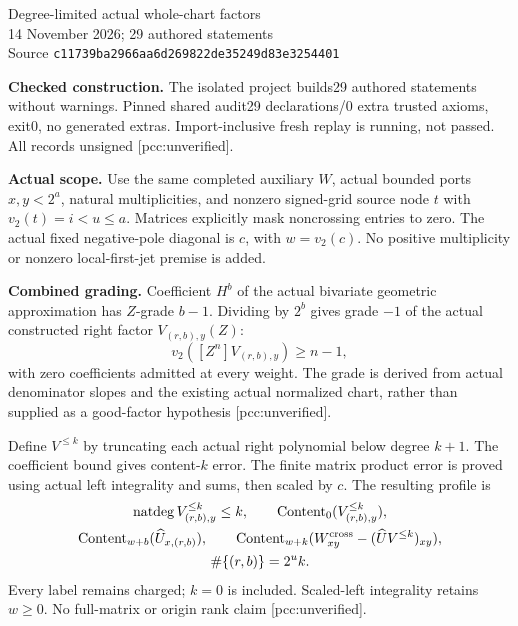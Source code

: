 \documentclass[10pt]{article}
\begin{document}
\begin{center}{\Large Degree-limited actual whole-chart factors}\\[4pt]
14 November 2026; 29 authored statements\\
Source \texttt{c11739ba2966aa6d269822de35249d83e3254401}
\end{center}
\textbf{Checked construction.} The isolated project builds29 authored statements
without warnings. Pinned shared audit29 declarations/0 extra trusted axioms,
exit0, no generated extras. Import-inclusive fresh replay is running,
not passed. All records unsigned [pcc:unverified].

\textbf{Actual scope.} Use the same completed auxiliary $W$, actual bounded
ports $x,y<2^a$, natural multiplicities, and nonzero signed-grid source node
$t$ with $v_2(t)=i<u\le a$. Matrices explicitly mask noncrossing entries to
zero. The actual fixed negative-pole diagonal is $c$, with $w=v_2(c)$.
No positive multiplicity or nonzero local-first-jet premise is added.

\textbf{Combined grading.} Coefficient $H^b$ of the actual bivariate
geometric approximation has $Z$-grade $b-1$. Dividing by $2^b$ gives
grade $-1$ of the actual constructed right factor $V_{(r,b),y}(Z)$:
\[
 v_2([Z^n]V_{(r,b),y})\ge n-1,
\]
with zero coefficients admitted at every weight. The grade is derived from
actual denominator slopes and the existing actual normalized chart, rather
than supplied as a good-factor hypothesis [pcc:unverified].

Define $V^{\le k}$ by truncating each actual right polynomial below degree
$k+1$. The coefficient bound gives content-$k$ error. The finite matrix
product error is proved using actual left integrality and sums, then scaled
by $c$. The resulting profile is
\[
 \begin{gathered}
 \operatorname{natdeg}V^{\le k}_{(r,b),y}\le k,\qquad
 \operatorname{Content}_0(V^{\le k}_{(r,b),y}),\\
 \operatorname{Content}_{w+b}(\widehat U_{x,(r,b)}),\qquad
 \operatorname{Content}_{w+k}
   (W^{\rm cross}_{xy}-(\widehat U V^{\le k})_{xy}),\\
 \#\{(r,b)\}=2^u k.
 \end{gathered}
\]
Every label remains charged; $k=0$ is included. Scaled-left integrality
retains $w\ge0$. No full-matrix or origin rank claim [pcc:unverified].
\end{document}
